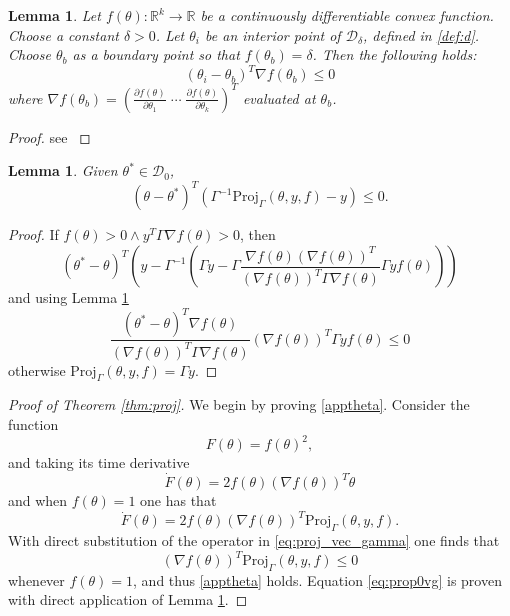 \documentclass[10pt,journal]{IEEEtran}
\theoremstyle{plain}%
\newtheorem{lem}[thm]{Lemma}
\theoremstyle{definition}
\newcommand{\be}[0]{\begin{equation}}
\newcommand{\ee}[0]{\end{equation}}
\newcommand{\ben}[0]{\begin{equation*}}
\newcommand{\een}[0]{\end{equation*}}
\begin{document}
\begin{lem}\label{lem:proj_diff}
Let $f(\theta):\mathbb R^k \rightarrow \mathbb R$ be a continuously differentiable convex function. Choose a constant $\delta>0$. Let $\theta_i$ be an interior point of $\mathcal D_\delta$, defined in \eqref{def:d}. Choose $\theta_b$ as a boundary point so that $f(\theta_b)=\delta$. Then the following holds:
\begin{equation}\label{eq:grad_geo}(\theta_i-\theta_b)^T \nabla f(\theta_b)\leq0\end{equation}
where $\nabla f(\theta_b)=\left(\frac{\partial f(\theta)}{\partial \theta_1 }\; \cdots \; \frac{\partial f(\theta)}{\partial \theta_k } \right)^T $ evaluated at $\theta_b$.
\end{lem}
\begin{proof}
see \cite[Lemma 4]{lav_arXiv}
\end{proof}

\begin{lem}\label{lem:hold10}
Given $\theta^*\in \mathcal D_0$,
\begin{equation}\label{eq:prop1vg}
(\theta-\theta^*)^T(\Gamma^{-1}\text{Proj}_\Gamma({\theta},{y},{f})-y)\leq 0.
\end{equation}
\end{lem}
\begin{proof}
If $ f(\theta)>0 \wedge y^T\Gamma \nabla f(\theta)>0$, then
\begin{equation*}
 (\theta^*-\theta)^T\left(y-\Gamma^{-1}\left(\Gamma y- \Gamma\frac{\nabla f(\theta) (\nabla f(\theta))^T}{(\nabla f(\theta))^T \Gamma \nabla f(\theta)} \Gamma yf(\theta)\right)\right)
\end{equation*}
and using Lemma \ref{lem:proj_diff}
\begin{equation*}
 \frac{(\theta^*-\theta)^T\nabla f(\theta)}{(\nabla f(\theta))^T\Gamma \nabla f(\theta)} {(\nabla f(\theta))^T \Gamma y {f(\theta)} }\leq 0
\end{equation*}
otherwise $\text{Proj}_\Gamma({\theta},{y},{f})=\Gamma y$.
\end{proof}
\begin{proof}[Proof of Theorem \ref{thm:proj}]
We begin by proving \eqref{apptheta}. Consider the function 
\be\label{F}
F(\theta)= f(\theta)^2,\ee and taking its time derivative
\ben
\dot F(\theta) = 2f(\theta)(\nabla f(\theta))^T\dot \theta 
\een
and when $f(\theta)=1$ one has that
\ben
\dot F(\theta) = 2f(\theta) \left(\nabla f(\theta)\right)^T\text{Proj}_\Gamma(\theta,y,f).
\een
With direct substitution of the operator in \eqref{eq:proj_vec_gamma} one finds that \be\label{nablaapp}{(\nabla f(\theta))^T\text{Proj}_\Gamma(\theta,y,f)\leq0}\ee whenever $f(\theta)=1$, and thus \eqref{apptheta} holds. Equation \eqref{eq:prop0vg} is proven with direct application of Lemma \ref{lem:hold10}.
\end{proof}
%
%
\end{document}
